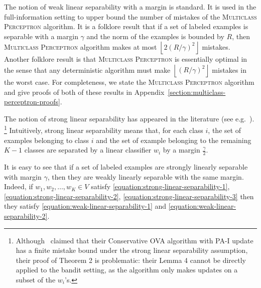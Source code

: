 The notion of weak linear separability with a margin is standard. It is used in the
full-information setting to upper bound the number of mistakes of the
\textsc{Multiclass Perceptron} algorithm. It is a
folklore result that if a set of labeled examples is separable with a margin
$\gamma$ and the norm of the examples is bounded by $R$, then \textsc{Multiclass
Perceptron} algorithm makes at most $\left\lfloor 2(R/\gamma)^2 \right \rfloor$
mistakes. Another folklore result is that \textsc{Multiclass Perceptron} is
essentially optimal in the sense that any deterministic algorithm must make
$\left\lfloor (R/\gamma)^2 \right \rfloor$ mistakes in the worst case. For
completeness, we state the \textsc{Multiclass Perceptron} algorithm
and give proofs of both of these results in
Appendix~\ref{section:multiclass-perceptron-proofs}.

The notion of strong linear separability has appeared in the literature
(see e.g.~\cite{Chen-Chen-Zhang-Chen-Zhang-2009}).
\footnote{Although~\cite{Chen-Chen-Zhang-Chen-Zhang-2009} claimed that their
Conservative OVA algorithm with PA-I update has a finite mistake bound under the strong
linear separability assumption, their proof of Theorem 2 is problematic: their
Lemma 4 cannot be directly applied to the bandit setting,
as the algorithm only makes updates on a subset of the $w_i$'s.}
Intuitively, strong linear
separability means that, for each class $i$, the set of examples belonging to class $i$ and
the set of example belonging to the remaining $K-1$ classes are separated by
a linear classifier $w_i$ by a margin $\frac \gamma 2$.


It is easy to see that if a set of labeled examples are strongly linearly
separable with margin $\gamma$, then they are weakly linearly separable with
the same margin. Indeed, if $w_1, w_2, \dots, w_K \in V$
satisfy \eqref{equation:strong-linear-separability-1},
\eqref{equation:strong-linear-separability-2},
\eqref{equation:strong-linear-separability-3} then they satisfy
\eqref{equation:weak-linear-separability-1} and
\eqref{equation:weak-linear-separability-2}.

